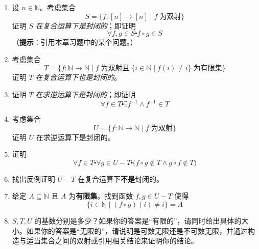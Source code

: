 \begin{exercise}
    \begin{enumerate}[label=(\alph*)]
        \item 设 $n \in \mathbb{N}$。考虑集合
              \[S = \{f : [n] \to [n] \mid f \;\text{为双射} \}\]
              证明 $S$ \emph{在复合运算下是封闭的}；即证明
              \[\forall f, g \in S \centerdot f \circ g \in S\]
              （\textbf{提示}：引用本章习题中的某个问题。）
        \item 考虑集合
              \[T = \big\{ f : \mathbb{N} \to \mathbb{N} \mid f \;\text{为双射且}\; \{i \in \mathbb{N} \mid f(i) \ne i\} \;\text{为有限集}\big\}\]
              证明 $T$ \emph{在复合运算下也是封闭的}。
        \item 证明 $T$ \emph{在求逆运算下是封闭的}；即证明
              \[\forall f \in T \centerdot \exists f^{-1} \land f^{-1} \in T\]
        \item 考虑集合
              \[U = \{f : \mathbb{N} \to \mathbb{N} \mid f \;\text{为双射} \}\]
              证明 $U$ 在求逆运算下是封闭的。
        \item 证明
              \[\forall f \in T \centerdot \forall g \in U - T \centerdot \big(f \circ g \notin T \land g \circ f \notin T\big)\]
        \item 找出反例证明 $U-T$ 在复合运算下\textbf{不是}封闭的。
        \item 给定 $A \subseteq \mathbb{N}$ 且 $A$ 为\textbf{有限集}。找到函数 $f, g \in U - T$ 使得
              \[\{i \in \mathbb{N}  \mid (f \circ g)(i) \ne i\} = A\]
        \item $S, T, U$ 的基数分别是多少？如果你的答案是``有限的''，请同时给出具体的大小。如果你的答案是``无限的''，请说明是可数无限还是不可数无限，并通过构造与适当集合之间的双射或引用相关结论来证明你的结论。
    \end{enumerate}
\end{exercise}
